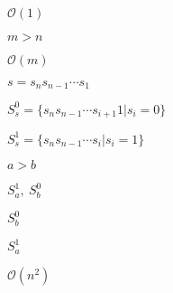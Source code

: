 \documentclass[10pt]{book}
\begin{document}
\begin{mdSnippets}
\begin{mdInlineSnippet}[3ab59a4ff434f7e6fa659a319d0c5535]
$\mathcal{O}(1)$\end{mdInlineSnippet}%
\begin{mdInlineSnippet}%
$m>n$\end{mdInlineSnippet}%
\begin{mdInlineSnippet}[d4bd4cf82c3d032cb125e03a3d0fa83e]%
$\mathcal{O}(m)$\end{mdInlineSnippet}%
\begin{mdInlineSnippet}%
$s=s_ns_{n-1}\cdots s_1$\end{mdInlineSnippet}%
\begin{mdInlineSnippet}%
$S_s^0=\{s_ns_{n-1}\cdots s_{i+1}1|s_i=0\}$\end{mdInlineSnippet}%
\begin{mdInlineSnippet}[8a8d028373bd76214e8ce1685765ef6f]%
$S_s^1=\{s_ns_{n-1}\cdots s_{i}|s_i=1\}$\end{mdInlineSnippet}%
\begin{mdInlineSnippet}[46fa7900cc397f3a4b3fa2e72d6885e7]%
$a>b$\end{mdInlineSnippet}%
\begin{mdInlineSnippet}[d899d1cc501b5b019a50b736e154325b]%
$S_a^1,\ S_b^0$\end{mdInlineSnippet}%
\begin{mdInlineSnippet}%
$S_b^0$\end{mdInlineSnippet}%
\begin{mdInlineSnippet}[f16f9b7d67d2017ef9f6202b752df04d]%
$S_a^1$\end{mdInlineSnippet}%
\begin{mdInlineSnippet}[551894444bf3cb0cc8350594310e2e99]%
$\mathcal{O}(n^2)$\end{mdInlineSnippet}%

\end{mdSnippets}
\end{document}
